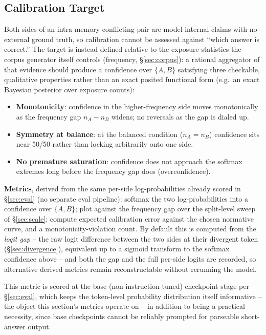 \documentclass[11pt]{article}
\begin{document}
\subsection{Calibration Target}
\label{sec:calibration}

Both sides of an intra-memory conflicting pair are model-internal claims with
no external ground truth, so calibration cannot be assessed against ``which
answer is correct.'' The target is instead defined relative to the exposure
statistics the corpus generator itself controls (frequency,
\S\ref{sec:corpus}): a rational aggregator of that evidence should produce a
confidence over $\{A, B\}$ satisfying three checkable, qualitative properties
rather than an exact posited functional form (e.g.\ an exact Bayesian
posterior over exposure counts):

\begin{itemize}
  \item \textbf{Monotonicity}: confidence in the higher-frequency side moves
    monotonically as the frequency gap $n_A - n_B$ widens; no reversals as
    the gap is dialed up.
  \item \textbf{Symmetry at balance}: at the balanced condition ($n_A = n_B$)
    confidence sits near 50/50 rather than locking arbitrarily onto one
    side.
  \item \textbf{No premature saturation}: confidence does not approach the
    softmax extremes long before the frequency gap does (overconfidence).
\end{itemize}

\textbf{Metrics}, derived from the same per-side log-probabilities already
scored in \S\ref{sec:eval} (no separate eval pipeline): softmax the two
log-probabilities into a confidence over $\{A, B\}$; plot against the
frequency gap over the split-level sweep of \S\ref{sec:scale}; compute
expected calibration error against the chosen normative curve, and a
monotonicity-violation count. By default this is computed from the
\emph{logit gap} -- the raw logit difference between the two sides at their
divergent token (\S\ref{sec:divergence}), equivalent up to a sigmoid
transform to the softmax confidence above -- and both the gap and the full
per-side logits are recorded, so alternative derived metrics remain
reconstructable without rerunning the model.

This metric is scored at the base (non-instruction-tuned) checkpoint stage
per \S\ref{sec:eval}, which keeps the token-level probability distribution
itself informative -- the object this section's metrics operate on -- in
addition to being a practical necessity, since base checkpoints cannot be
reliably prompted for parseable short-answer output.
\end{document}

